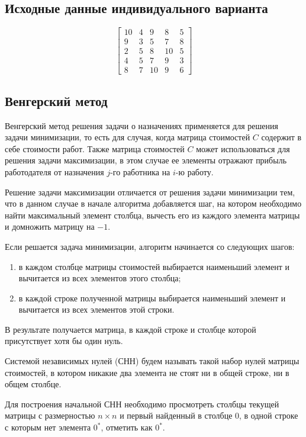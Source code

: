 \documentclass[a4paper,14pt]{article}
\begin{document}
\subsection{Исходные данные индивидуального варианта}

\begin{equation}
\begin{bmatrix}
10 & 4 & 9 & 8 & 5\\
9 & 3 & 5 & 7 & 8\\
2 & 5 & 8 & 10 & 5\\
4 & 5 & 7 & 9 & 3\\
8 & 7 & 10 & 9 & 6
\end{bmatrix}
\end{equation}


\subsection{Венгерский метод}

Венгерский метод решения задачи о назначениях применяется для решения задачи минимизации, то есть для случая, когда матрица стоимостей $C$ содержит в себе стоимости работ. Также матрица стоимостей $C$ может использоваться для решения задачи максимизации, в этом случае ее элементы отражают прибыль работодателя от назначения $j$-го работника на $i$-ю работу. 

Решение задачи максимизации отличается от решения задачи минимизации тем, что в данном случае в начале алгоритма добавляется шаг, на котором необходимо найти максимальный элемент столбца, вычесть его из каждого элемента матрицы и домножить матрицу на $-1$.

Если решается задача минимизации, алгоритм начинается со следующих шагов:
\begin{enumerate}
\item в каждом столбце матрицы стоимостей выбирается наименьший элемент и вычитается из всех элементов этого столбца;
\item в каждой строке полученной матрицы выбирается наименьший элемент и вычитается из всех элементов этой строки.
\end{enumerate}

В результате получается матрица, в каждой строке и столбце которой присутствует хотя бы один нуль.

Системой независимых нулей (СНН) будем называть такой набор нулей матрицы стоимостей, в котором никакие два элемента не стоят ни в общей строке, ни в общем столбце.

Для построения начальной СНН необходимо просмотреть столбцы текущей матрицы с размерностью $n \times n$ и первый найденный в столбце 0, в одной строке с которым нет элемента $0^*$, отметить как $0^*$. 
\end{document}
